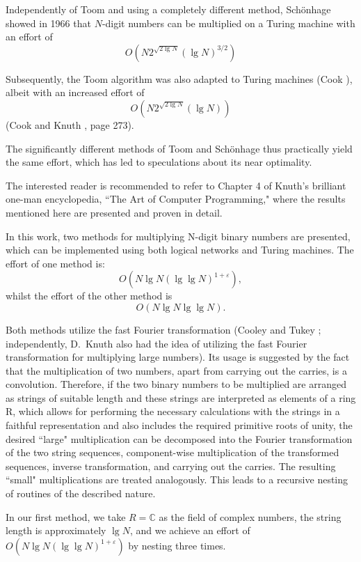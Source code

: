 \documentclass{article}
\begin{document}
Independently of Toom and using a completely different method, Schönhage \cite{schoenhage} showed in 1966 that $N$-digit numbers can be multiplied on a Turing machine with an effort of
\[
O\left(N 2^{\sqrt{2 \lg N}} (\lg N)^{3 / 2}\right)
\]

Subsequently, the Toom algorithm was also adapted to Turing machines (Cook \cite{cook2}), albeit with an increased effort of
\[
O\left(N 2^{\sqrt{2 \lg N}} (\lg N)\right)
\]
(Cook \cite{cook1} and Knuth \cite{knuth}, page 273).

The significantly different methods of Toom and Schönhage thus practically yield the same effort, which has led to speculations about its near optimality.

The interested reader is recommended to refer to Chapter 4 of Knuth's brilliant one-man encyclopedia, ``The Art of Computer Programming," where the results mentioned here are presented and proven in detail.

In this work, two methods for multiplying N-digit binary numbers are presented, which can be implemented using both logical networks and Turing machines. The effort of one method is:
\[
O(N \lg N (\lg \lg N)^{1 + \varepsilon}),
\]
whilst the effort of the other method is
\[
O(N \lg N \lg \lg N).
\]

Both methods utilize the fast Fourier transformation (Cooley and Tukey \cite{cooley}; independently, D.\ Knuth also had the idea of utilizing the fast Fourier transformation for multiplying large numbers). Its usage is suggested by the fact that the multiplication of two numbers, apart from carrying out the carries, is a convolution. Therefore, if the two binary numbers to be multiplied are arranged as strings of suitable length and these strings are interpreted as elements of a ring R, which allows for performing the necessary calculations with the strings in a faithful representation and also includes the required primitive roots of unity, the desired ``large" multiplication can be decomposed into the Fourier transformation of the two string sequences, component-wise multiplication of the transformed sequences, inverse transformation, and carrying out the carries. The resulting ``small" multiplications are treated analogously. This leads to a recursive nesting of routines of the described nature.

In our first method, we take $R = \mathbb{C}$ as the field of complex numbers, the string length is approximately $\lg N$, and we achieve an effort of $O(N \lg N(\lg \lg N)^{1 + \varepsilon})$ by nesting three times.
\end{document}
